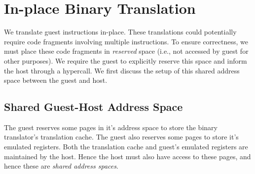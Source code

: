 \documentclass[10pt,twocolumn]{article}
\begin{document}

%

\section{In-place Binary Translation}
\label{sec:bintrans}
We translate guest instructions in-place. These translations could potentially
require code fragments involving multiple instructions. To ensure correctness, we
must place these code fragments in {\em reserved} space (i.e., not accessed by
guest for other purposes). We require the guest to explicitly reserve this space
and inform the host through a hypercall. We first discuss the setup of this shared
address space between the guest and host.
\subsection{Shared Guest-Host Address Space}
\label{sec:sharedspace}
The guest reserves some pages in it's address space to store the
binary translator's translation
cache. The guest also reserves some pages to store it's emulated registers.
Both the translation cache and guest's emulated registers are maintained by
the host. Hence the host must also have access to these pages, and hence these
are {\em shared address spaces}.
\end{document}
